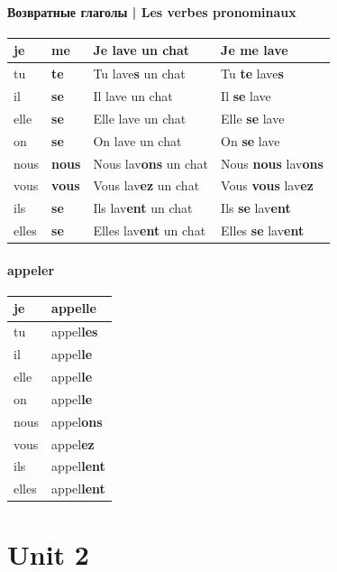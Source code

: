 \documentclass[9pt, oneside]{article}
\begin{document}
\paragraph*{Возвратные глаголы | Les verbes pronominaux}
\begin{tabular}{l|l|l|l}
	je & {\bfseries me} & Je lave un chat & Je {\bfseries me} lave\\
	\hline
	tu & {\bfseries te} & Tu lave{\bfseries s} un chat & Tu {\bfseries te} lave{\bfseries s}\\
	\hline
	il & {\bfseries se} & Il lave un chat & Il {\bfseries se} lave\\
	\hline
	elle & {\bfseries se} & Elle lave un chat & Elle {\bfseries se} lave\\
	\hline
	on & {\bfseries se} & On lave un chat & On {\bfseries se} lave\\
	\hline
	nous & {\bfseries nous} & Nous lav{\bfseries ons} un chat & Nous {\bfseries nous} lav{\bfseries ons}\\
	\hline
	vous & {\bfseries vous} & Vous lav{\bfseries ez} un chat & Vous {\bfseries vous} lav{\bfseries ez}\\
	\hline
	ils & {\bfseries se} & Ils lav{\bfseries ent} un chat & Ils {\bfseries se} lav{\bfseries ent}\\
	\hline
	elles & {\bfseries se} & Elles lav{\bfseries ent} un chat & Elles {\bfseries se} lav{\bfseries ent}\\
\end{tabular}

\paragraph*{appeler}
\begin{tabular}{l|l}
	je & appelle\\
	\hline
	tu & appel{\bfseries les}\\
	\hline
	il & appel{\bfseries le}\\
	\hline
	elle & appel{\bfseries le}\\
	\hline
	on & appel{\bfseries le}\\
	\hline
	nous & appel{\bfseries ons}\\
	\hline
	vous & appel{\bfseries ez}\\
	\hline
	ils & appel{\bfseries lent}\\
	\hline
	elles & appel{\bfseries lent}\\
\end{tabular}

\section{Unit 2}
\end{document}
